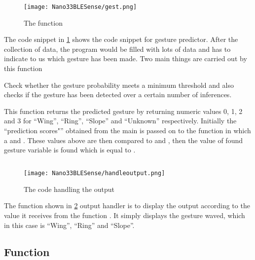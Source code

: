 \subsubsection{}

\begin{figure}[h!]
    \texttt{[image: Nano33BLESense/gest.png]}
    \caption{The function }
    \label{gest}
\end{figure}

The code snippet in \ref{gest} shows the code snippet for gesture predictor.
After the collection of data, the program would be filled with lots of data and has to indicate to us which gesture has been made. Two main things are carried out by this function 

Check whether the gesture probability meets a minimum threshold and also checks if the gesture has been detected over a certain number of inferences. 


This function returns the predicted gesture by returning numeric values 0, 1, 2 and 3 for ``Wing'', ``Ring'', ``Slope'' and ``Unknown'' respectively. 
Initially the ``prediction scores"'' obtained from the main is passed on to the function in which a  and .
These values  above are then compared to  and , then the value of found gesture variable is found which is equal to . 



\subsection{} 

\begin{figure}[h!]
    \texttt{[image: Nano33BLESense/handleoutput.png]}
    \caption{The code handling the output}
    \label{op}
\end{figure}

The function shown in \ref{op}  output handler is to display the output according to the value it receives from the function . It simply displays the gesture waved, which in this case is ``Wing'', ``Ring'' and ``Slope''. 

\subsection{Function } 

